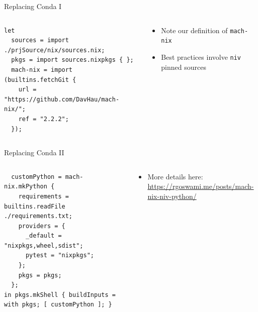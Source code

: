 \documentclass[bigger,unknownkeysallowed,aspectratio=169,red,colorblocks]{beamer}
\begin{document}
\begin{frame}[label={sec:orgc03a098},fragile]{Replacing Conda I}
 \begin{columns}
\begin{column}{0.6\columnwidth}
\begin{verbatim}
let
  sources = import ./prjSource/nix/sources.nix;
  pkgs = import sources.nixpkgs { };
  mach-nix = import (builtins.fetchGit {
    url = "https://github.com/DavHau/mach-nix/";
    ref = "2.2.2";
  });
\end{verbatim}
\end{column}

\begin{column}{0.4\columnwidth}
\begin{itemize}
\item Note our definition of \texttt{mach-nix}
\item Best practices involve \texttt{niv} pinned sources
\end{itemize}
\end{column}
\end{columns}
\end{frame}
\begin{frame}[label={sec:org8ad2749},fragile]{Replacing Conda II}
 \begin{columns}
\begin{column}{0.6\columnwidth}
\begin{verbatim}
  customPython = mach-nix.mkPython {
    requirements = builtins.readFile ./requirements.txt;
    providers = {
      _default = "nixpkgs,wheel,sdist";
      pytest = "nixpkgs";
    };
    pkgs = pkgs;
  };
in pkgs.mkShell { buildInputs = with pkgs; [ customPython ]; }
\end{verbatim}
\end{column}
\begin{column}{0.4\columnwidth}
\begin{itemize}
\item More details here: \url{https://rgoswami.me/posts/mach-nix-niv-python/}
\end{itemize}
\end{column}
\end{columns}
\end{frame}
\end{document}
